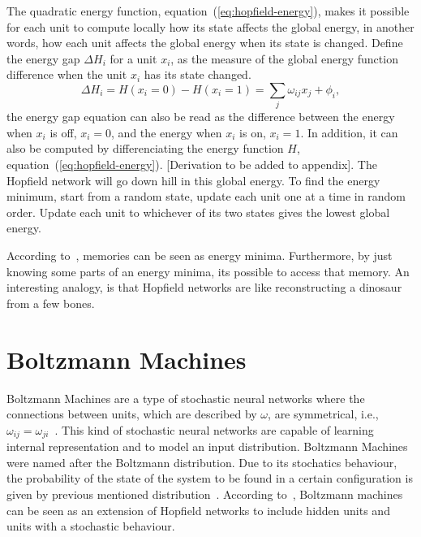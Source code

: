 The quadratic energy function, equation~(\ref{eq:hopfield-energy}), makes it possible for each unit to compute locally how its state affects the global energy, in another words, how each unit affects the global energy when its state is changed.
Define the energy gap $\Delta H_{i}$ for a unit $x_{i}$, as the measure of the global energy function difference when the unit $x_{i}$ has its state changed.
\begin{equation}
  \label{eq:hopfield-energy-gap}
  \Delta H_{i} = H(x_{i} = 0) - H(x_{i} = 1) = \sum_{j} \omega_{ij} x_{j} + \phi_{i},
\end{equation}
the energy gap equation can also be read as the difference between the energy when $x_{i}$ is off, $x_{i} = 0$, and the energy when $x_{i}$ is on, $x_{i} = 1$.
In addition, it can also be computed by differenciating the energy function $H$, equation~(\ref{eq:hopfield-energy}). [Derivation to be added to appendix].
The Hopfield network will go down hill in this global energy.
To find the energy minimum, start from a random state, update each unit one at a time in random order. Update each unit to whichever of its two states gives the lowest global energy.

According to~, memories can be seen as energy minima.
Furthermore, by just knowing some parts of an energy minima, its possible to access that memory.
An interesting analogy, is that Hopfield networks are like reconstructing a dinosaur from a few bones.



\section{Boltzmann Machines}%
\label{ch:bm:bm}%

Boltzmann Machines are a type of stochastic neural networks where the connections between units, which are described by $\omega$, are symmetrical, i.e., $\omega_{ij} = \omega_{ji}$~\cite{bib:hertz1991}. 
This kind of stochastic neural networks are capable of learning internal representation and to model an input distribution. 
Boltzmann Machines were named after the Boltzmann distribution. 
Due to its stochatics behaviour, the probability of the state of the system to be found in a certain configuration is given by previous mentioned distribution~\cite{bib:hertz1991}. 
According to~\cite{bib:montufar2018}, Boltzmann machines can be seen as an extension of Hopfield networks to include hidden units and units with a stochastic behaviour.

